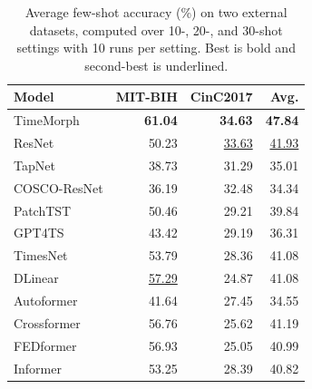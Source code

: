 \begin{table}[t]
\centering
\caption{Average few-shot accuracy (\%) on two external datasets, computed over 10-, 20-, and 30-shot settings with 10 runs per setting. Best is bold and second-best is underlined.}
\label{tab:external-fewshot-avg}
\begin{tabular}{lrrr}
\toprule
Model & MIT-BIH & CinC2017 & Avg. \\
\midrule
TimeMorph & \textbf{61.04} & \textbf{34.63} & \textbf{47.84} \\
ResNet & 50.23 & \underline{33.63} & \underline{41.93} \\
TapNet & 38.73 & 31.29 & 35.01 \\
COSCO-ResNet & 36.19 & 32.48 & 34.34 \\
PatchTST & 50.46 & 29.21 & 39.84 \\
GPT4TS & 43.42 & 29.19 & 36.31 \\
TimesNet & 53.79 & 28.36 & 41.08 \\
DLinear & \underline{57.29} & 24.87 & 41.08 \\
Autoformer & 41.64 & 27.45 & 34.55 \\
Crossformer & 56.76 & 25.62 & 41.19 \\
FEDformer & 56.93 & 25.05 & 40.99 \\
Informer & 53.25 & 28.39 & 40.82 \\
\bottomrule
\end{tabular}
\end{table}

